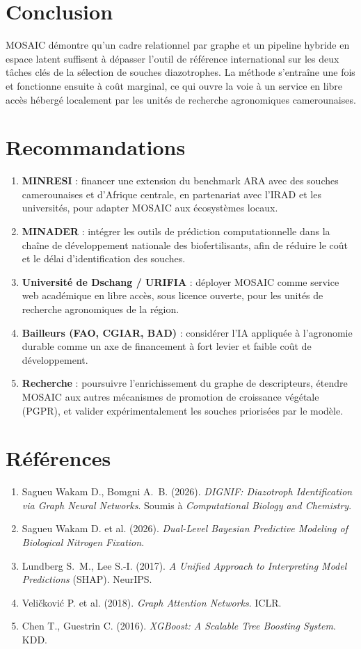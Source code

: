 \documentclass[14pt,a4paper]{extarticle}
\begin{document}
\section*{Conclusion}
MOSAIC démontre qu'un cadre relationnel par graphe et un pipeline hybride en espace latent suffisent à dépasser l'outil de référence international sur les deux tâches clés de la sélection de souches diazotrophes. La méthode s'entraîne une fois et fonctionne ensuite à coût marginal, ce qui ouvre la voie à un service en libre accès hébergé localement par les unités de recherche agronomiques camerounaises.

\section*{Recommandations}
\begin{enumerate}
    \item \textbf{MINRESI} : financer une extension du benchmark ARA avec des souches camerounaises et d'Afrique centrale, en partenariat avec l'IRAD et les universités, pour adapter MOSAIC aux écosystèmes locaux.
    \item \textbf{MINADER} : intégrer les outils de prédiction computationnelle dans la chaîne de développement nationale des biofertilisants, afin de réduire le coût et le délai d'identification des souches.
    \item \textbf{Université de Dschang / URIFIA} : déployer MOSAIC comme service web académique en libre accès, sous licence ouverte, pour les unités de recherche agronomiques de la région.
    \item \textbf{Bailleurs (FAO, CGIAR, BAD)} : considérer l'IA appliquée à l'agronomie durable comme un axe de financement à fort levier et faible coût de développement.
    \item \textbf{Recherche} : poursuivre l'enrichissement du graphe de descripteurs, étendre MOSAIC aux autres mécanismes de promotion de croissance végétale (PGPR), et valider expérimentalement les souches priorisées par le modèle.
\end{enumerate}

\section*{Références}
\begin{enumerate}
    \item Sagueu Wakam D., Bomgni A.~B. (2026). \emph{DIGNIF: Diazotroph Identification via Graph Neural Networks}. Soumis à \emph{Computational Biology and Chemistry}.
    \item Sagueu Wakam D. et al. (2026). \emph{Dual-Level Bayesian Predictive Modeling of Biological Nitrogen Fixation}.
    \item Lundberg S.~M., Lee S.-I. (2017). \emph{A Unified Approach to Interpreting Model Predictions} (SHAP). NeurIPS.
    \item Veličković P. et al. (2018). \emph{Graph Attention Networks}. ICLR.
    \item Chen T., Guestrin C. (2016). \emph{XGBoost: A Scalable Tree Boosting System}. KDD.
\end{enumerate}
\end{document}
